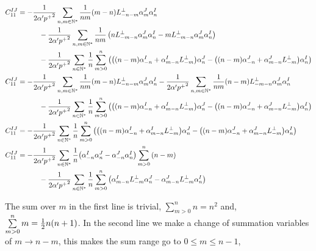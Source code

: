 \begin{align*}
    C_{11}^{IJ}&=-\frac{1}{2\alpha'{p^+}^2}\sum\limits_{n,m\in\mathbb N^\ast}\frac{1}{nm}\qty(m-n)L^\perp_{-n-m}\alpha^J_m\alpha^I_n\\
    &\quad\quad\quad-\frac{1}{2\alpha'{p^+}^2}\sum\limits_{n,m\in\mathbb N^\ast}\frac{1}{nm}\left(nL^\perp_{-m-n}\alpha^J_m\alpha^I_{n}-mL^\perp_{-m-n}\alpha^J_{m}\alpha^I_n\right)\\
    &\quad\quad\quad-\frac{1}{2\alpha'{p^+}^2}\sum\limits_{n\in\mathbb N^\ast}\frac{1}{n}\sum\limits_{m>0}^{n}\left(\qty(\qty(n-m)\alpha^I_{-n}+\alpha_{m-n}^IL^\perp_{-m})\alpha^J_n-\qty(\qty(n-m)\alpha^J_{-n}+\alpha^J_{m-n}L^\perp_{-m})\alpha^I_n\right)\\
    C_{11}^{IJ}&=-\frac{1}{2\alpha'{p^+}^2}\sum\limits_{n,m\in\mathbb N^\ast}\frac{1}{nm}\qty(m-n)L^\perp_{-n-m}\alpha^J_m\alpha^I_n-\frac{1}{2\alpha'{p^+}^2}\sum\limits_{n,m\in\mathbb N^\ast}\frac{1}{nm}\qty(n-m)L^\perp_{-m-n}\alpha^J_m\alpha^I_{n}\\
    &\quad\quad\quad-\frac{1}{2\alpha'{p^+}^2}\sum\limits_{n\in\mathbb N^\ast}\frac{1}{n}\sum\limits_{m>0}^{n}\left(\qty(\qty(n-m)\alpha^I_{-n}+\alpha_{m-n}^IL^\perp_{-m})\alpha^J_n-\qty(\qty(n-m)\alpha^J_{-n}+\alpha^J_{m-n}L^\perp_{-m})\alpha^I_n\right)\\
    C_{11}^{IJ}&=-\frac{1}{2\alpha'{p^+}^2}\sum\limits_{n\in\mathbb N^\ast}\frac{1}{n}\sum\limits_{m>0}^{n}\left(\qty(\qty(n-m)\alpha^I_{-n}+\alpha_{m-n}^IL^\perp_{-m})\alpha^J_n-\qty(\qty(n-m)\alpha^J_{-n}+\alpha^J_{m-n}L^\perp_{-m})\alpha^I_n\right)\\
    C_{11}^{IJ}&=-\frac{1}{2\alpha'{p^+}^2}\sum\limits_{n\in\mathbb N^\ast}\frac{1}{n}\qty(\alpha^I_{-n}\alpha^J_n-\alpha^J_{-n}\alpha^I_n)\sum\limits_{m>0}^{n}\qty(n-m)\\
    &\quad\quad\quad-\frac{1}{2\alpha'{p^+}^2}\sum\limits_{n\in\mathbb N^\ast}\frac{1}{n}\sum\limits_{m>0}^{n}\qty(\alpha_{m-n}^IL^\perp_{-m}\alpha^J_n-\alpha^J_{m-n}L^\perp_{-m}\alpha^I_n)
\end{align*}

The sum over $m$ in the first line is trivial, $\sum\limits_{m>0}^nn=n^2$ and, $\sum\limits_{m>0}^nm=\frac12n\qty(n+1)$. In the second line we make a 
change of summation variables of $m\rightarrow n-m$, this makes the sum range go to $0\leq m\leq n-1$,

